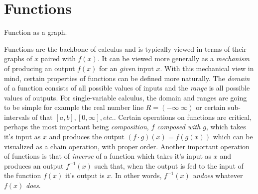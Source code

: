 \section{Functions}
\begin{marginfigure}[-5\baselineskip]
  \caption{Function as a graph.}
\end{marginfigure}
Functions are the backbone of calculus and is typically viewed in terms of their graphs of $x$ paired with $f(x)$. It can be viewed more generally as a {\it mechanism} of producing an output $f(x)$ for an {\it given} input $x$. With this mechanical view in mind, certain properties of functions can be defined more naturally. The {\it domain} of a function consists of all possible values of inputs and the {\it range} is all possible values of outputs. For single-variable calculus, the domain and ranges are going to be simple for example the real number line $R=(-\infty ~\infty)$ or certain sub-intervals of that $[a,b], [0, \infty], etc.$. 
Certain operations on functions are critical, perhaps the most important being \textit{composition}, \textit{$f$ composed with $g$}, which takes it's input as $x$ and produces the output $(f\cdot g)(x)=f(g(x))$ which can be visualized as a chain operation, with proper order.
%
Another important operation of functions is that of \textit{inverse} of a function which takes it's input as $x$ and produces an output $f^{-1}(x)$ such that, when the output is fed to the input of the function $f(x)$ it's output is $x$. In other words, $f^{-1}(x)$ \textit{undoes} whatever $f(x)$ \textit{does}.